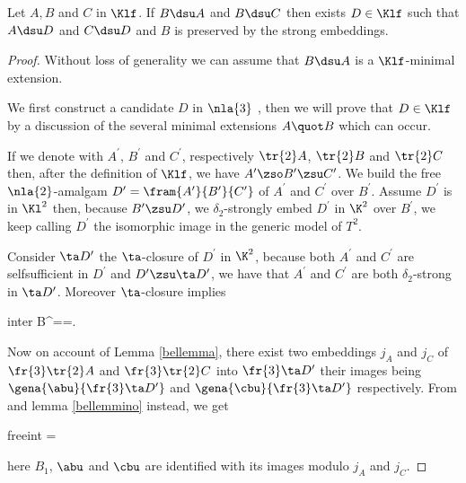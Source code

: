 \begin{lem}
Let $A,B$ and $C$ in $\Klf$. If $B\dsu A$ and $B\dsu C$ then
exists $D\in\Klf$ such that $A\dsu D$ and $C\dsu D$ and $B$ is preserved
by the strong embeddings.
\end{lem}
\begin{proof}
Without loss of generality we can assume that $B\dsu A$ is a $\Klf$-minimal extension.

We first construct a candidate $D$ in $\nla{3}$%
, then
we will prove that $D\in\Klf$ by a discussion of the several minimal extensions $A\quot B$
which can occur. 

If we denote with $A^{\prime}$, $B^{\prime}$ and $C^{\prime}$, respectively $\tr{2}A$, $\tr{2}B$ and
$\tr{2}C$ then, after the definition of $\Klf$, we have $A^{\prime}\zso B^{\prime}\zsu C^{\prime}$.
We build the free $\nla{2}$-amalgam $D^{\prime}=\fram{A^{\prime}}{B^{\prime}}{C^{\prime}}$ of $A^{\prime}$ and $C^{\prime}$ over $B^{\prime}$. Assume $D^{\prime}$ is in $\Kl^{2}$ then, because
$B^{\prime}\zsu D^{\prime}$,
we $\delta_{2}$-strongly embed $D^{\prime}$ in $\K^{2}$ over $B^{\prime}$,
we keep calling $D^{\prime}$ the isomorphic image in the generic model of $T^{2}$.

Consider $\ta D^{\prime}$ the $\ta$-closure of $D^{\prime}$ in $\K^{2}$,
because both $A^{\prime}$ and $C^{\prime}$ are selfsufficient in $D^{\prime}$
and $D^{\prime}\zsu\ta D^{\prime}$, we have that $A^{\prime}$ and $C^{\prime}$ are both $\delta_{2}$-strong
in $\ta D^{\prime}$. Moreover $\ta$-closure implies
\begin{labeq}{inter}
B^{\prime}==\cap{}.
\end{labeq}

Now on account of Lemma \ref{bellemma},
there exist two embeddings $j_{A}$ and $j_{C}$ of $\fr{3}\tr{2}A$ and $\fr{3}\tr{2}C$
into $\fr{3}\ta D^{\prime}$ their images being $\gena{\abu}{\fr{3}\ta D^{\prime}}$ and $\gena{\cbu}
{\fr{3}\ta D^{\prime}}$ respectively. From  and lemma \ref{bellemmino} instead, we get
\begin{labeq}{freeint}
=\cap{}
\end{labeq}
here $B_{1}$, $\abu$ and $\cbu$ are identified with its images modulo $j_{A}$ and $j_{C}$. 


\end{proof}
